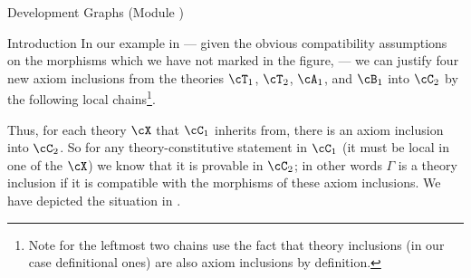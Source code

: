 \begin{omgroup}[id=complex-theories,short=Complex Theories,
                            creators=miko,contributors=frabe]
\begin{omgroup}[id=development-graphs,short=Development Graphs]{Development Graphs (Module
  {})}
\begin{module}[id=dgraph]
\begin{omgroup}[id=dg-intro,short=Introduction]{Introduction}
In our example in {} --- given the obvious compatibility assumptions
on the morphisms which we have not marked in the figure, --- we can justify four new axiom
inclusions from the theories $\cT_1$, $\cT_2$, $\cA_1$, and $\cB_1$ into $\cC_2$ by the
following local chains\footnote{Note for the leftmost two chains use the fact that theory
  inclusions (in our case definitional ones) are also axiom inclusions by
  definition.}.
\begin{center}
\end{center}

Thus, for each theory $\cX$ that $\cC_1$ inherits from, there is an axiom inclusion into
$\cC_2$. So for any theory-constitutive statement in $\cC_1$ (it must be local in one of
the $\cX$) we know that it is provable in $\cC_2$; in other words $\Gamma$ is a theory
inclusion if it is compatible with the morphisms of these axiom inclusions.  We have
depicted the situation in {}.


\end{omgroup}
\end{module}
\end{omgroup}
\end{omgroup}
